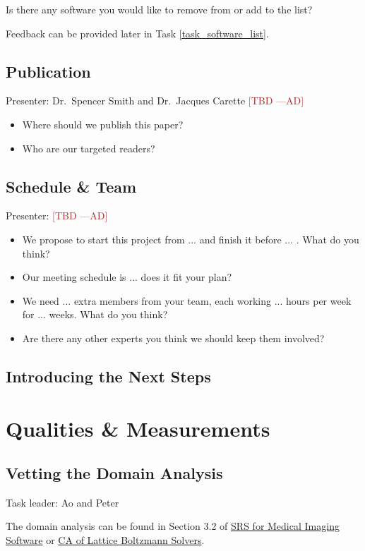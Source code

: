 \documentclass[12pt]{article}
\newcommand{\authornote}[3]{\textcolor{#1}{[#3 ---#2]}}
\newcommand{\authornote}[3]{}
\newcommand{\ad}[1]{\authornote{brown}{AD}{#1}} %
\begin{document}
Is there any software you would like to remove from or add to the list?

Feedback can be provided later in Task \ref{task_software_list}.

\subsection{Publication}
Presenter: Dr.\ Spencer Smith and Dr.\ Jacques Carette \ad{TBD}

\begin{itemize}
\item Where should we publish this paper?
\item Who are our targeted readers?
\end{itemize}

\subsection{Schedule \& Team}
Presenter: \ad{TBD}

\begin{itemize}
\item We propose to start this project from ... and finish it before ... . What
do you think?
\item Our meeting schedule is ... does it fit your plan?
\item We need ... extra members from your team, each working ... hours per week
for ... weeks. What do you think?
\item Are there any other experts you think we should keep them involved?
\end{itemize}

\subsection{Introducing the Next Steps}

\section{Qualities \& Measurements}
\label{qualities_measurements}

\subsection{Vetting the Domain Analysis}
\label{domain_analysis}
Task leader: Ao and Peter

The domain analysis can be found in Section 3.2 of
\href{https://github.com/Ao99/MISEG/blob/master/docs/SRS/SRS.pdf}{SRS for
Medical Imaging Software} or
\href{https://github.com/peter-michalski/LatticeBoltzmannSolvers/blob/master/docs/SRS/CA.pdf}{CA
of Lattice Boltzmann Solvers}.
\end{document}

